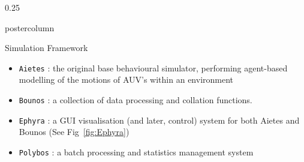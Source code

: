 \documentclass[final,hyperref={pdfpagelabels=false}]{beamer}
\def\colwidth{0.25\linewidth}
\begin{document}
\begin{frame}[fragile]
\begin{columns}[t]
\begin{column}{\colwidth}
\begin{beamercolorbox}[center,wd=\textwidth]{postercolumn}
\begin{minipage}[T]{.98\textwidth}
{\begin{block}{Simulation Framework}
\begin{itemize}
                \item \texttt{Aietes} : the original base behavioural simulator, performing agent-based modelling of the motions of AUV's within an 
                  environment
                \item \texttt{Bounos} : a collection of data processing and collation functions.
                \item \texttt{Ephyra} : a GUI visualisation (and later, control) system for both Aietes and Bounos (See Fig~\ref{fig:Ephyra})
                \item \texttt{Polybos} : a batch processing and statistics management system
              \end{itemize}

              \vspace{0.5\baselineskip}


\end{block}}
\end{minipage}
\end{beamercolorbox}
\end{column}
\end{columns}
\end{frame}
\end{document}
